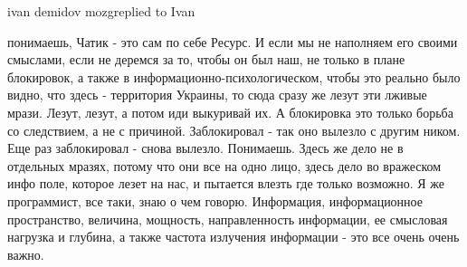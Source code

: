 ivan demidov mozgreplied to Ivan

понимаешь, Чатик - это сам по себе Ресурс. И если мы не наполняем его своими
смыслами, если не деремся за то, чтобы он был наш, не только в плане
блокировок, а также в информационно-психологическом, чтобы это реально было
видно, что здесь - территория Украины, то сюда сразу же лезут эти лживые мрази.
Лезут, лезут, а потом иди выкуривай их. А блокировка это только борьба со
следствием, а не с причиной. Заблокировал - так оно вылезло с другим ником. Еще
раз заблокировал - снова вылезло. Понимаешь. Здесь же дело не в отдельных
мразях, потому что они все на одно лицо, здесь дело во вражеском инфо поле,
которое лезет на нас, и пытается влезть где только возможно. Я же программист,
все таки, знаю о чем говорю. Информация, информационное пространство, величина,
мощность, направленность информации, ее смысловая нагрузка и глубина, а также
частота излучения информации - это все очень очень важно.


